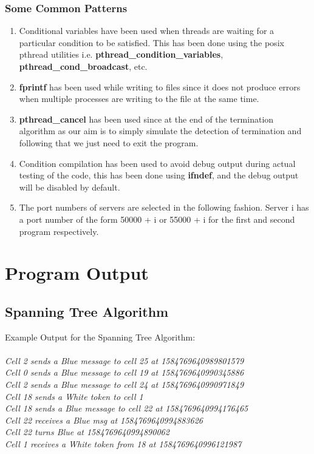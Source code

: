 \documentclass[a4paper,12pt]{report}
\begin{document}
\subsubsection{Some Common Patterns}
\begin{enumerate}
\item Conditional variables have been used when threads are waiting for a particular condition to be satisfied. This has been done using the posix pthread utilities i.e. \textbf{pthread\_condition\_variables}, \textbf{pthread\_cond\_broadcast}, etc.
\item \textbf{fprintf} has been used while writing to files since it does not produce errors when multiple processes are writing to the file at the same time.
\item \textbf{pthread\_cancel} has been used since at the end of the termination algorithm as our aim is to simply simulate the detection of termination and following that we just need to exit the program.
\item Condition compilation has been used to avoid debug output during actual testing of the code, this has been done using \textbf{ifndef}, and the debug output will be disabled by default.
\item The port numbers of servers are selected in the following fashion. Server i has a port number of the form 50000 + i or 55000 + i for the first and second program respectively.
\end{enumerate}
\section{Program Output}
\subsection{Spanning Tree Algorithm}
Example Output for the Spanning Tree Algorithm:\\\\
\textit{Cell 2 sends a Blue message to cell 25 at 1584769640989801579\\
Cell 0 sends a Blue message to cell 19 at 1584769640990345886\\
Cell 2 sends a Blue message to cell 24 at 1584769640990971849\\
Cell 18 sends a White token to cell 1\\
Cell 18 sends a Blue message to cell 22 at 1584769640994176465\\
Cell 22 receives a Blue msg at 1584769640994883626\\
Cell 22 turns Blue at 1584769640994890062\\
Cell 1 receives a White token from 18 at 1584769640996121987\\}
\end{document}
